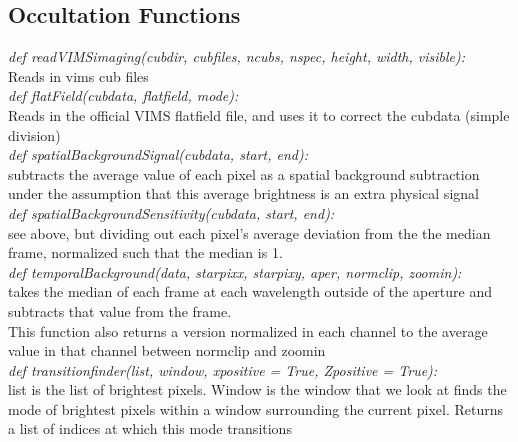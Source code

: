 \documentclass[12pt]{article}
\begin{document}
\subsection{Occultation Functions}

{\it \noindent def readVIMSimaging(cubdir, cubfiles, ncubs, nspec, height, width, visible):}\\

  Reads in vims cub files\\

{\it \noindent def flatField(cubdata, flatfield, mode):}\\

  Reads in the official VIMS flatfield file, and uses it to correct the cubdata
  (simple division)\\

{\it \noindent def spatialBackgroundSignal(cubdata, start, end):}\\

  subtracts the average value of each pixel as a spatial background subtraction
  under the assumption that this average brightness is an extra physical signal
  \\

{\it \noindent def spatialBackgroundSensitivity(cubdata, start, end):}\\

  see above, but dividing out each pixel's average deviation from the the median
  frame, normalized such that the median is 1.\\

{\it \noindent def temporalBackground(data, starpixx, starpixy, aper, normclip, zoomin):}\\

  takes the median of each frame at each wavelength outside of the aperture
  and subtracts that value from the frame.\\
  This function also returns a version normalized in each channel to the average
  value in that channel between normclip and zoomin\\

{\it \noindent def transitionfinder(list, window, xpositive = True, Zpositive = True):}\\

  list is the list of brightest pixels. Window is the window that we look at
  finds the mode of brightest pixels within a window surrounding the current
  pixel. Returns a list of indices at which this mode transitions\\
\end{document}
